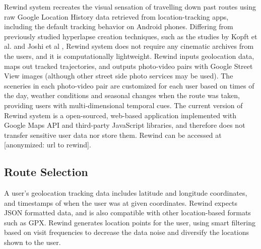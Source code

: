 \documentclass{sigchi}
\begin{document}
Rewind system recreates the visual sensation of travelling down past routes using raw Google Location History data retrieved from location-tracking apps, including the default tracking behavior on Android phones. Differing from previously studied hyperlapse creation techniques, such as the studies by Kopft et al. and Joshi et al \cite{Kopf:2014:FHV:2601097.2601195, Joshi:2015:RHC:2809654.2766954}, Rewind system does not require any cinematic archives from the users, and it is computationally lightweight. Rewind inputs geolocation data, maps out tracked trajectories, and outputs photo-video pairs with Google Street View images (although other street side photo services may be used). The sceneries in each photo-video pair are customized for each user based on times of the day, weather conditions and seasonal changes when the route was taken, providing users with multi-dimensional temporal cues. The current version of Rewind system is a open-sourced, web-based application implemented with Google Maps API and third-party JavaScript libraries, and therefore does not transfer sensitive user data nor store them. Rewind can be accessed at [anonymized: url to rewind].  %


\subsection{Route Selection}
A user's geolocation tracking data includes latitude and longitude coordinates, and timestamps of when the user was at given coordinates. Rewind expects JSON formatted data, and is also compatible with other location-based formats such as GPX. Rewind generates location points for the user, using smart filtering based on visit frequencies to decrease the data noise and diversify the locations shown to the user.
\end{document}

